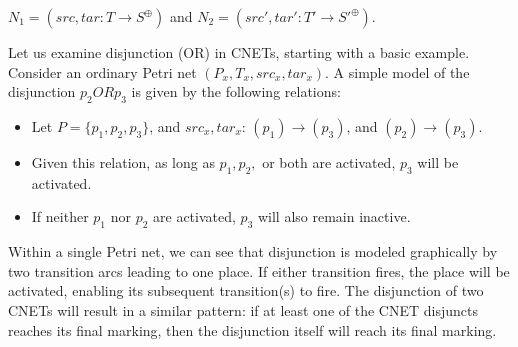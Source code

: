 $N_1 = (src, tar: T \to S^\oplus)$ and $N_2 = (src', tar': T' \to S'^\oplus)$.\bigskip\\
\begin{example}
  \label{ex:OR-PN}
Let us examine disjunction (OR) in CNETs, starting with a basic example. Consider an ordinary Petri net $(P_x, T_x, src_x, tar_x)$. A simple model of the disjunction $p_2 OR p_3$ is given by the following relations:
  \begin{itemize}
  \item Let $P = \{p_1, p_2, p_3\}$, and $src_x, tar_x$: $(p_1) \to (p_3)$, and $(p_2) \to (p_3)$. 
  \item Given this relation, as long as $p_1, p_2,$ or both are activated, $p_3$ will be activated. 
  \item If neither $p_1$ nor $p_2$ are activated, $p_3$ will also remain inactive.  
  \end{itemize}
Within a single Petri net, we can see that disjunction is modeled graphically by two transition arcs leading to one place. If either transition fires, the place will be activated, enabling its subsequent transition(s) to fire. The disjunction of two CNETs will result in a similar pattern: if at least one of the CNET disjuncts reaches its final marking, then the disjunction itself will reach its final marking.   
\end{example}
